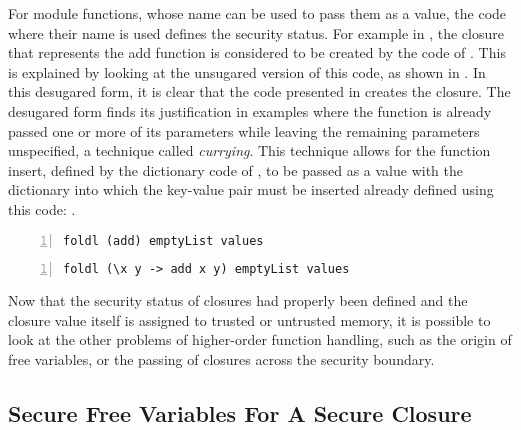 For module functions, whose name can be used to pass them as a value, the code where their name is used defines the security status.
For example in , the closure that represents the add function is considered to be created by the code of .
This is explained by looking at the unsugared version of this code, as shown in .
In this desugared form, it is clear that the code presented in  creates the closure.
The desugared form finds its justification in examples where the function is already passed one or more of its parameters while leaving the remaining parameters unspecified, a technique called \emph{currying}.
This technique allows for the function insert, defined by the dictionary code of , to be passed as a value with the dictionary into which the key-value pair must be inserted already defined using this code: .

\begin{lstlisting}[frame=single, language=ML,caption=Passing a predefined function., label=code:implicit,numbers=left]
foldl (add) emptyList values
\end{lstlisting}

\begin{lstlisting}[frame=single, language=ML,caption={Passing a predefined function, unsugared.}, label=code:explicit,numbers=left]
foldl (\x y -> add x y) emptyList values
\end{lstlisting}

Now that the security status of closures had properly been defined and the closure value itself is assigned to trusted or untrusted memory, it is possible to look at the other problems of higher-order function handling, such as the origin of free variables, or the passing of closures across the security boundary.





\subsection{Secure Free Variables For A Secure Closure}

